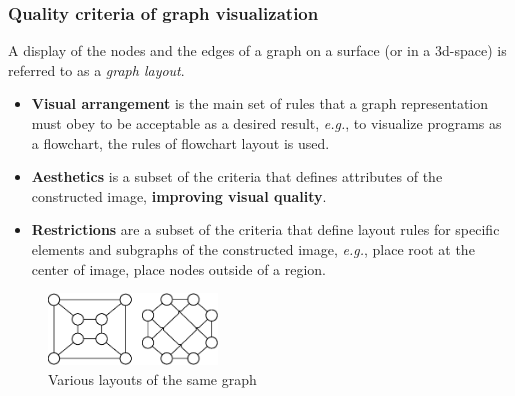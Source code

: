 \documentclass{beamer}
\begin{document}
\begin{frame}
\frametitle{Quality criteria of graph visualization}

A display of the nodes and the edges of a graph on a surface (or in a 3d-space) is referred to as a \emph{graph layout}.

	\begin{itemize}
\item \textbf{Visual arrangement} is the main set of rules that a graph representation must obey to be acceptable as a desired result, \textit{e.g.}, to visualize programs as a flowchart, the rules of flowchart layout is used.
\item \textbf{Aesthetics} is a subset of the criteria that defines attributes of the constructed image, \textbf{improving visual quality}.
\item \textbf{Restrictions} are a subset of the criteria that define layout rules for specific elements and subgraphs of the constructed image, \textit{e.g.}, place root at the center of image, place nodes outside of a region.
\end{itemize}
	\begin{figure}[htbp]
		\centering
			\includegraphics[width=0.40\textwidth]{Pic/Pic1.eps}
                \caption{Various layouts of the same graph}
		\label{fig:VisExample}
	\end{figure}
\end{frame}

\end{document}

